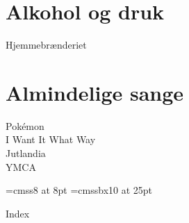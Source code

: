 \documentclass[a5paper]{book}
\let\oldmedskip\medskip
\renewcommand{\medskip}{\oldmedskip\pagebreak[2]}
\newcommand{\SBThechapter}[0]{}
\newcommand{\SBChapter}[1]{
    \startcontents
    \chapter*{#1} 
      \begin{minipage}{.8\textwidth}
        \printcontents{}{1}{}
      \end{minipage}%
    \renewcommand{\SBThechapter}{#1}
    \clearpage
}
\begin{document}
\onecolumn
\SBChapter{Alkohol og druk}
\twocolumn


Hjemmebrænderiet

\onecolumn
\SBChapter{Almindelige sange}
\twocolumn



Pokémon\\
I Want It What Way\\
Jutlandia\\
YMCA







% 


\clearpage
\font\myTinySF=cmss8    at  8pt
\font\myHugeSF=cmssbx10 at 25pt
\renewcommand{\indexspace}{\medskip}

{\parindent 8pt
  {\myTitleFont Index}}\par
\vskip 5pt
\renewcommand{\SBThechapter}{Index}
\renewcommand{\item}{\par\hangindent=40pt}
\renewcommand{\subitem}{\par\hangindent=40pt \hspace*{20pt}}
\renewcommand{\subsubitem}{\par\hangindent=40pt \hspace*{30pt}}


\end{document}
